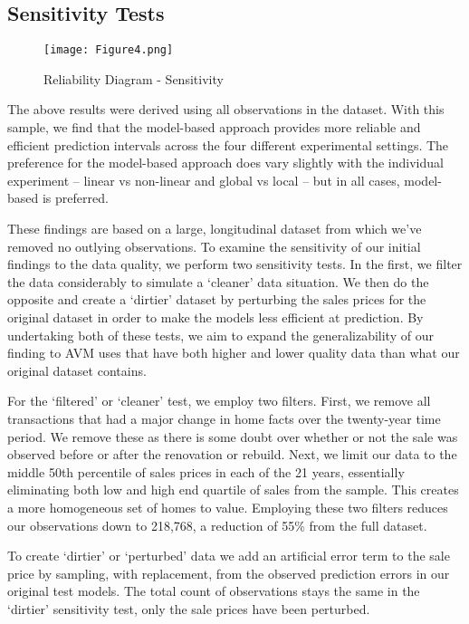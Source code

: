 \documentclass[colTwo]{format}
\theoremstyle{definition}
\begin{document}
\subsection{Sensitivity Tests}

\begin{figure*}[h!]
\centering
\texttt{[image: Figure4.png]}
\caption{Reliability Diagram - Sensitivity}
\label{fig:calibsens}
\end{figure*}

The above results were derived using all observations in the dataset.  With this sample, we find that the model-based approach provides more reliable and efficient prediction intervals across the four different experimental settings.  The preference for the model-based approach does vary slightly with the individual experiment -- linear vs non-linear and global vs local -- but in all cases, model-based is preferred.  

These findings are based on a large, longitudinal dataset from which we’ve removed no outlying observations.  To examine the sensitivity of our initial findings to the data quality, we perform two sensitivity tests.  In the first, we filter the data considerably to simulate a ‘cleaner’ data situation.  We then do the opposite and create a ‘dirtier’ dataset by perturbing the sales prices for the original dataset in order to make the models less efficient at prediction.  By undertaking both of these tests, we aim to expand the generalizability of our finding to AVM uses that have both higher and lower quality data than what our original dataset contains.

For the ‘filtered’ or ‘cleaner’ test, we employ two filters.  First, we remove all transactions that had a major change in home facts over the twenty-year time period.  We remove these as there is some doubt over whether or not the sale was observed before or after the renovation or rebuild. Next, we limit our data to the middle 50th percentile of sales prices in each of the 21 years, essentially eliminating both low and high end quartile of sales from the sample.  This creates a more homogeneous set of homes to value.  Employing these two filters reduces our observations down to 218,768, a reduction of 55\% from the full dataset. 

To create  ‘dirtier’ or ‘perturbed’ data we add an artificial error term to the sale price by sampling, with replacement, from the observed prediction errors in our original test models. The total count of observations stays the same in the ‘dirtier’ sensitivity test, only the sale prices have been perturbed. 
\end{document}
